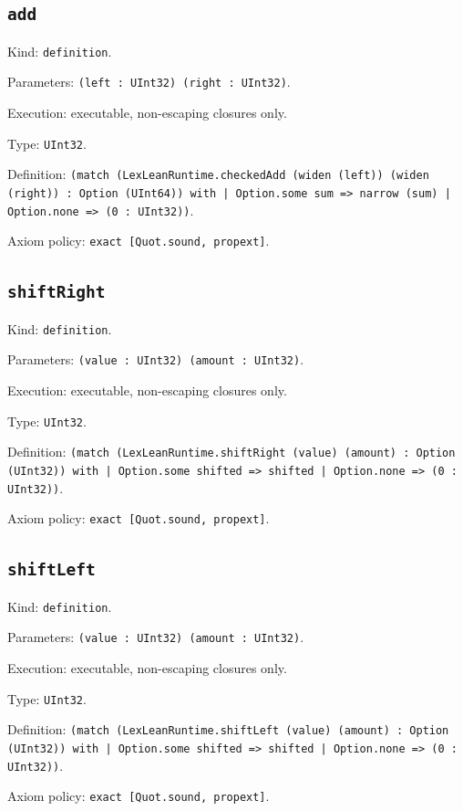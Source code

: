 \documentclass[11pt]{article}
\begin{document}
\subsection*{\texttt{add}}
\noindent Kind: \texttt{definition}.\par
\noindent Parameters: \texttt{(left : UInt32) (right : UInt32)}.\par
\noindent Execution: executable, non-escaping closures only.\par
\noindent Type: \texttt{UInt32}.\par
\noindent Definition: \texttt{(match (LexLeanRuntime.checkedAdd (widen (left)) (widen (right)) : Option (UInt64)) with | Option.some sum => narrow (sum) | Option.none => (0 : UInt32))}.\par
\noindent Axiom policy: \texttt{exact [Quot.sound, propext]}.\par
\subsection*{\texttt{shiftRight}}
\noindent Kind: \texttt{definition}.\par
\noindent Parameters: \texttt{(value : UInt32) (amount : UInt32)}.\par
\noindent Execution: executable, non-escaping closures only.\par
\noindent Type: \texttt{UInt32}.\par
\noindent Definition: \texttt{(match (LexLeanRuntime.shiftRight (value) (amount) : Option (UInt32)) with | Option.some shifted => shifted | Option.none => (0 : UInt32))}.\par
\noindent Axiom policy: \texttt{exact [Quot.sound, propext]}.\par
\subsection*{\texttt{shiftLeft}}
\noindent Kind: \texttt{definition}.\par
\noindent Parameters: \texttt{(value : UInt32) (amount : UInt32)}.\par
\noindent Execution: executable, non-escaping closures only.\par
\noindent Type: \texttt{UInt32}.\par
\noindent Definition: \texttt{(match (LexLeanRuntime.shiftLeft (value) (amount) : Option (UInt32)) with | Option.some shifted => shifted | Option.none => (0 : UInt32))}.\par
\noindent Axiom policy: \texttt{exact [Quot.sound, propext]}.\par
\end{document}

